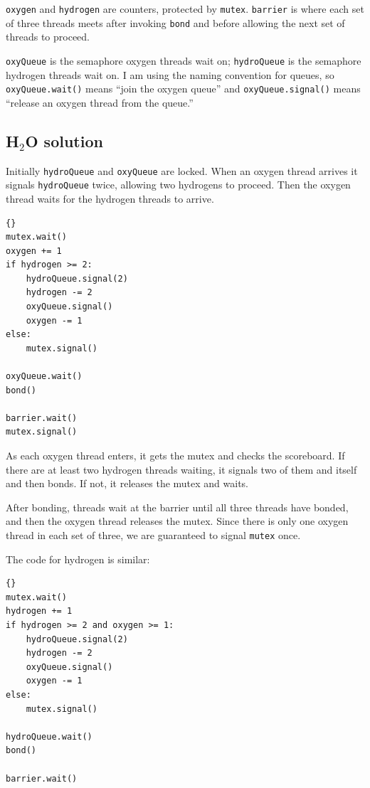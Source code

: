 \documentclass{book}
\newcommand{\clearemptydoublepage}{\newpage\cleardoublepage}
\begin{document}
{\tt oxygen} and {\tt hydrogen} are counters, protected by {\tt mutex}.
{\tt barrier} is where each set of three threads meets after
invoking {\tt bond} and before allowing the next set of threads
to proceed.

{\tt oxyQueue} is the semaphore oxygen threads wait on;
{\tt hydroQueue} is the semaphore hydrogen threads wait on.
I am using the naming convention for queues, so
{\tt oxyQueue.wait()} means ``join the oxygen queue'' and
{\tt oxyQueue.signal()} means ``release an oxygen thread from
the queue.''


\clearemptydoublepage
\subsection {H$_2$O solution}

Initially {\tt hydroQueue} and {\tt oxyQueue} are locked.  When
an oxygen thread arrives it signals {\tt hydroQueue} twice,
allowing two hydrogens to proceed.  Then the oxygen thread waits
for the hydrogen threads to arrive.

\begin{latin}
\begin{latin}
\begin{lstlisting}[title={Oxygen code}]{}
mutex.wait()
oxygen += 1
if hydrogen >= 2:
    hydroQueue.signal(2)
    hydrogen -= 2
    oxyQueue.signal()
    oxygen -= 1
else:
    mutex.signal()

oxyQueue.wait()
bond()

barrier.wait()
mutex.signal()
\end{lstlisting}
\end{latin}
\end{latin}

As each oxygen thread enters, it gets the mutex and checks the scoreboard.
If there are at least two hydrogen threads waiting, it signals two of
them and itself and then bonds.  If not, it releases the mutex and
waits.

After bonding, threads wait at the barrier until all three threads
have bonded, and then the oxygen thread releases the mutex.  Since
there is only one oxygen thread in each set of three, we are guaranteed
to signal {\tt mutex} once.

The code for hydrogen is similar:

\begin{latin}
\begin{latin}
\begin{lstlisting}[title={Hydrogen code}]{}
mutex.wait()
hydrogen += 1
if hydrogen >= 2 and oxygen >= 1:
    hydroQueue.signal(2)
    hydrogen -= 2
    oxyQueue.signal()
    oxygen -= 1
else:
    mutex.signal()

hydroQueue.wait()
bond()

barrier.wait()
\end{lstlisting}
\end{latin}
\end{latin}
\end{document}
